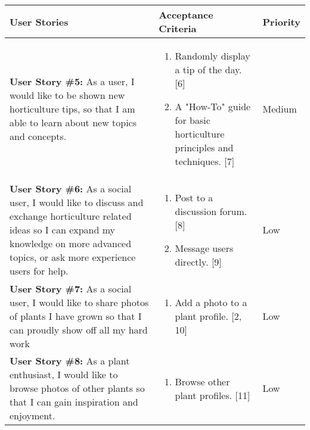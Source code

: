\documentclass[portfolio.tex.tex]{subfiles}
\begin{document}
					\begin{tabular}{p{6cm}|p{6cm}|p{4cm}}
						\large\textbf{User Stories} & \large \textbf{Acceptance Criteria} &\large \textbf{ Priority} \\
						\hline

						\textbf{User Story \#5:} As a user, I would like to be shown new horticulture tips, so that I am able to learn about new topics and concepts.  &
						\vspace{-0.8cm}
						\begin{enumerate}
							\item  	Randomly display a tip of the day. [6]
							\item 	A "How-To" guide for basic horticulture principles and techniques. [7]
						\end{enumerate}&

						\vspace{-1cm}\color{orange}Medium\\

						\textbf{User Story \#6:} As a social user, I would like to discuss and exchange horticulture related ideas so I can expand my knowledge on more advanced topics, or ask more experience users for help.  &
						\vspace{-0.8cm}
						\begin{enumerate}
							\item  	Post to a discussion forum. [8]
							\item 	Message  users directly. [9]
						\end{enumerate}&

						\vspace{-1cm}\color{blue}Low\\
						\textbf{User Story \#7:} As a social user, I would like to share photos of plants I have grown so that I can proudly show off all my hard work  &

						\vspace{-0.8cm}
						\begin{enumerate}
							\item  	Add a photo to a plant profile. [2, 10]
						\end{enumerate}&

						\vspace{-1cm}\color{blue}Low\\

						\textbf{User Story \#8:} As a plant enthusiast, I would like to browse photos of other plants so that I can gain inspiration and enjoyment.  &
						\vspace{-0.8cm}
						\begin{enumerate}
							\item  	Browse other plant profiles. [11]
						\end{enumerate}&

						\vspace{-1cm}\color{blue}Low\\

					\end{tabular}
\end{document}

